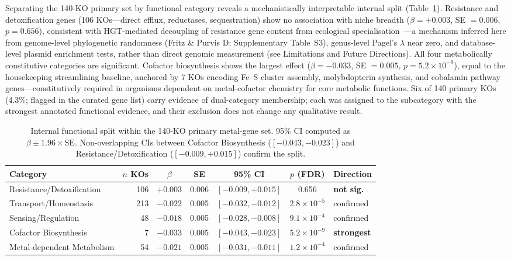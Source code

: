 \documentclass[times]{zHenriquesLab-StyleBioRxiv}
\begin{document}
Separating the 140-KO primary set by functional category reveals a
mechanistically interpretable internal split (Table~\ref{tab:4}). Resistance
and detoxification genes (106 KOs---direct efflux, reductases, sequestration)
show no association with niche breadth ($\beta = +0.003$, SE $= 0.006$,
$p = 0.656$), consistent with HGT-mediated decoupling of resistance gene
content from ecological specialisation~\cite{pal2015,gios2025}---a mechanism
inferred here from genome-level phylogenetic randomness (Fritz \& Purvis D;
Supplementary Table~S3), genus-level Pagel's $\lambda$ near zero, and
database-level plasmid enrichment tests, rather than direct genomic measurement
(see Limitations and Future Directions). All four
metabolically constitutive categories are significant. Cofactor biosynthesis
shows the largest effect ($\beta = -0.033$, SE $= 0.005$, $p = 5.2 \times
10^{-9}$), equal to the housekeeping streamlining baseline, anchored by 7 KOs
encoding Fe--S cluster assembly, molybdopterin synthesis, and cobalamin
pathway genes---constitutively required in organisms dependent on
metal-cofactor chemistry for core metabolic functions. Six of 140 primary KOs
(4.3\%; flagged in the curated gene list) carry evidence of dual-category
membership; each was assigned to the subcategory with the strongest annotated
functional evidence, and their exclusion does not change any qualitative result.

\begin{table}[htbp]
\caption{Internal functional split within the 140-KO primary metal-gene set.
95\% CI computed as $\beta \pm 1.96 \times \mathrm{SE}$. Non-overlapping CIs
between Cofactor Biosynthesis ($[-0.043, -0.023]$) and
Resistance/Detoxification ($[-0.009, +0.015]$) confirm the split.}
\label{tab:4}
\centering
\small
\begin{tabular}{lrccccl}
\toprule
Category & $n$ KOs & $\beta$ & SE & 95\% CI & $p$ (FDR) & Direction \\
\midrule
Resistance/Detoxification & 106 & $+0.003$ & 0.006 & $[-0.009, +0.015]$ & 0.656
  & \textbf{not sig.} \\
Transport/Homeostasis & 213 & $-0.022$ & 0.005 & $[-0.032, -0.012]$ & $2.8 \times 10^{-5}$
  & confirmed \\
Sensing/Regulation & 48 & $-0.018$ & 0.005 & $[-0.028, -0.008]$ & $9.1 \times 10^{-4}$
  & confirmed \\
Cofactor Biosynthesis & 7 & $\mathbf{-0.033}$ & 0.005 & $[-0.043, -0.023]$ & $5.2 \times 10^{-9}$
  & \textbf{strongest} \\
Metal-dependent Metabolism & 54 & $-0.021$ & 0.005 & $[-0.031, -0.011]$ & $1.2 \times 10^{-4}$
  & confirmed \\
\bottomrule
\end{tabular}
\end{table}
\end{document}
